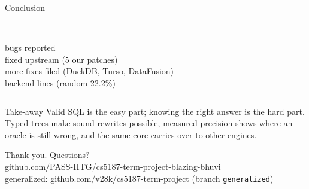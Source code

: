 \documentclass[aspectratio=169,10pt]{beamer}
\begin{document}
\begin{frame}{Conclusion}
\begin{columns}[T]
\\\small \pg bugs reported
\\\small fixed upstream (5 our patches)
\\\small more fixes filed (DuckDB, Turso, DataFusion)
\\\small backend lines (random 22.2\%)
\end{columns}
\bigskip
\begin{block}{Take-away}
Valid SQL is the easy part; knowing the right answer is the hard part. Typed trees make sound
rewrites possible, measured precision shows where an oracle is still wrong, and the same core
carries over to other engines.
\end{block}
\end{frame}

\begin{frame}[standout]
Thank you. Questions?\\[6pt]
\normalsize github.com/PASS-IITG/cs5187-term-project-blazing-bhuvi\\
\small generalized: github.com/v28k/cs5187-term-project (branch \texttt{generalized})
\end{frame}
\end{document}
